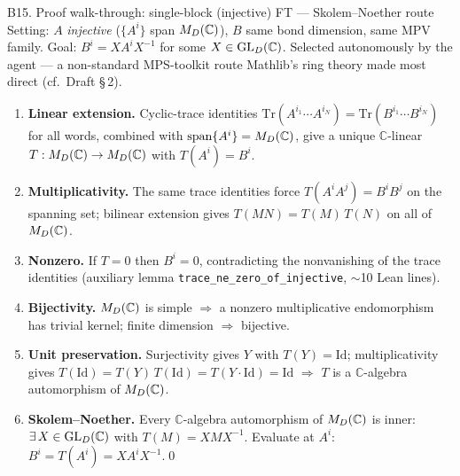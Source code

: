 \documentclass[aspectratio=169,10pt]{beamer}
\newcommand{\Id}{\mathrm{Id}}
\newcommand{\Tr}{\mathrm{Tr}}
\begin{document}
\begin{frame}{B15. Proof walk-through: single-block (injective) FT --- Skolem--Noether route}
    \vspace{-0.4em}
    \textcolor{dimwhite}{\footnotesize Setting: $A$ \emph{injective} ($\{A^i\}$ span $M_D(\mathbb{C})$), $B$ same bond dimension, same MPV family. Goal: $B^i = X A^i X^{-1}$ for some $X \in \mathrm{GL}_D(\mathbb{C})$. Selected autonomously by the agent --- a non-standard MPS-toolkit route Mathlib's ring theory made most direct (cf.\ Draft \S\,2).}
    \vspace{0.2em}
    \begin{enumerate}\itemsep0.10em\small
        \item \textbf{Linear extension.}
            Cyclic-trace identities $\Tr(A^{i_1}\!\cdots A^{i_N}) = \Tr(B^{i_1}\!\cdots B^{i_N})$ for all words, combined with $\mathrm{span}\{A^i\} = M_D(\mathbb{C})$, give a unique $\mathbb{C}$-linear $T : M_D(\mathbb{C}) \to M_D(\mathbb{C})$ with $T(A^i) = B^i$.

        \item \textbf{Multiplicativity.}
            The same trace identities force $T(A^i A^j) = B^i B^j$ on the spanning set; bilinear extension gives $T(MN) = T(M)\,T(N)$ on all of $M_D(\mathbb{C})$.

        \item \textbf{Nonzero.}
            If $T = 0$ then $B^i = 0$, contradicting the nonvanishing of the trace identities (auxiliary lemma \texttt{trace\_ne\_zero\_of\_injective}, $\sim$10 Lean lines).

        \item \textbf{Bijectivity.}
            $M_D(\mathbb{C})$ is simple $\Rightarrow$ a nonzero multiplicative endomorphism has trivial kernel; finite dimension $\Rightarrow$ bijective.

        \item \textbf{Unit preservation.}
            Surjectivity gives $Y$ with $T(Y) = \Id$; multiplicativity gives $T(\Id) = T(Y)\,T(\Id) = T(Y \cdot \Id) = \Id$ $\Rightarrow$ $T$ is a $\mathbb{C}$-algebra automorphism of $M_D(\mathbb{C})$.

        \item \textbf{Skolem--Noether.}
            Every $\mathbb{C}$-algebra automorphism of $M_D(\mathbb{C})$ is inner: $\exists\, X \in \mathrm{GL}_D(\mathbb{C})$ with $T(M) = X M X^{-1}$. Evaluate at $A^i$: $B^i = T(A^i) = X A^i X^{-1}$.\hfill\qed
    \end{enumerate}
    \vspace{0.2em}
    \begin{center}
    \end{center}
\end{frame}
\end{document}
